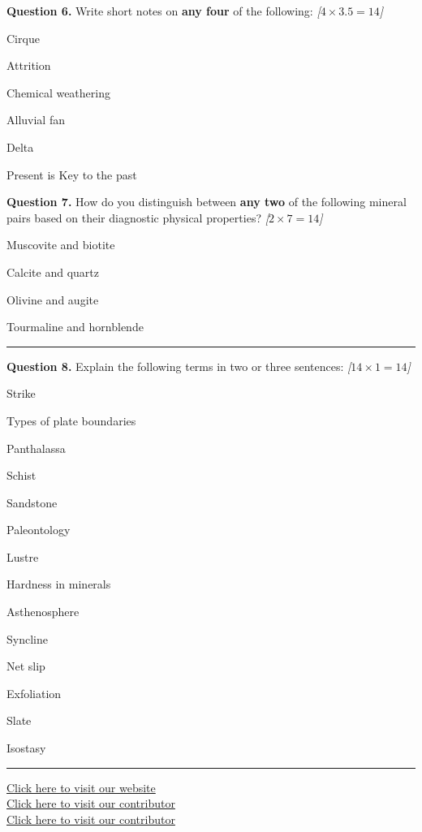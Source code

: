 \documentclass[11pt,a4paper]{article}
\newcommand{\pts}[1]{\hfill   \textit{[#1]}}
\begin{document}
\medskip


\noindent   \textbf{Question 6.} Write short notes on   \textbf{any four} of the following: \pts{$4  \times 3.5 = 14$}

\begin{parts}
  \item Cirque
  \item Attrition
  \item Chemical weathering
  \item Alluvial fan
  \item Delta
  \item Present is Key to the past
\end{parts}

\medskip


\noindent   \textbf{Question 7.} How do you distinguish between   \textbf{any two} of the following mineral pairs based on their diagnostic physical properties? \pts{$2  \times 7 = 14$}

\begin{parts}
  \item Muscovite and biotite
  \item Calcite and quartz
  \item Olivine and augite
  \item Tourmaline and hornblende
\end{parts}

\bigskip


\rule{\linewidth}{0.4pt}\smallskip




\noindent   \textbf{Question 8.} Explain the following terms in two or three sentences: \pts{$14  \times 1 = 14$}

\begin{parts}
  \item Strike
  \item Types of plate boundaries
  \item Panthalassa
  \item Schist
  \item Sandstone
  \item Paleontology
  \item Lustre
  \item Hardness in minerals
  \item Asthenosphere
  \item Syncline
  \item Net slip
  \item Exfoliation
  \item Slate
  \item Isostasy
\end{parts}

\vfill\rule{\linewidth}{0.4pt}

\begin{center}\small
\href{https://bhu-exam.vercel.app/}{Click here to visit our website}\\[4pt]
\href{https://me-aryan.vercel.app/}{Click here to visit our contributor}\\[4pt]
\href{https://quashan-me.vercel.app/}{Click here to visit our contributor}
\end{center}
\end{document}
